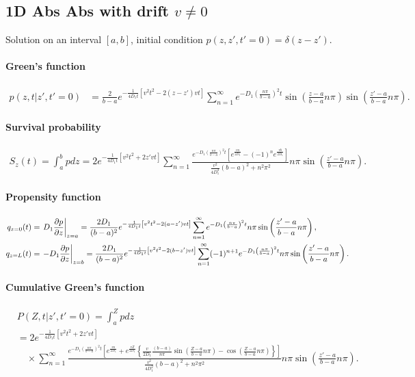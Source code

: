 
\subsection{1D Abs Abs with drift $v\neq 0$}

Solution on an interval $[a,b]$, initial condition $p(z,z',t'=0)=\delta (z-z')$.

\paragraph{Green's function}
\begin{align}
  p(z,t|z',t'=0) &= \frac{2}{b-a}e^{-\frac{1}{4D_1t}\left[v^2t^2 - 2(z-z')vt \right]}
  \sum_{n=1}^{\infty}
  e^{-D_1\left(\frac{n\pi}{b-a}\right)^2 t} \sin\left(\frac{z-a}{b-a}n\pi\right) \sin\left(\frac{z'-a}{b-a}n\pi\right).
\end{align}

\paragraph{Survival probability}
\begin{align}
  S_z(t) = \int_a^b pdz
  = 2e^{-\frac{1}{4D_1t}\left[ v^2t^2 + 2 z'vt \right]}
    \sum_{n=1}^{\infty}
	\frac{ e^{-D_1\left(\frac{n\pi}{b-a}\right)^2 t} \left[ e^{\frac{va}{2D_1}} - (-1)^n e^{\frac{vb}{2D_1}}\right] }
	     { \frac{v^2}{4D_1^2}(b-a)^2 + n^2\pi^2 }
	n\pi \sin\left(\frac{z'-a}{b-a}n\pi \right).
\end{align}

\paragraph{Propensity function}
\begin{align}
  q_{z=0}(t) &= \left.D_1 \frac{\partial p}{\partial z}\right|_{z=a} = \frac{2 D_1}{(b-a)^2} e^{-\frac{1}{4D_1 t}\left[ v^2t^2 - 2(a-z')vt \right]}
  \sum_{n=1}^{\infty} e^{-D_1\left(\frac{n\pi}{b-a}\right)^2 t} n\pi \sin\left(\frac{z'-a}{b-a}n\pi\right),\\
  q_{z=L}(t) &= \left.- D_1 \frac{\partial p}{\partial z}\right|_{z=b} = \frac{2 D_1}{(b-a)^2} e^{-\frac{1}{4D_1 t}\left[ v^2t^2 - 2(b-z')vt \right]}
  \sum_{n=1}^{\infty} (-1)^{n+1} e^{-D_1\left(\frac{n\pi}{b-a}\right)^2 t} n\pi \sin\left(\frac{z'-a}{b-a}n\pi\right).
\end{align}

\paragraph{Cumulative Green's function}
\begin{align}
 & P(Z,t|z',t'=0) = \int_a^Z p dz &\\
 & = 2e^{-\frac{1}{4D_1t}\left[v^2t^2 + 2z'vt \right]}  &\\
 & \quad\times \sum_{n=1}^{\infty}
      \frac{	e^{-D_1\left(\frac{n\pi}{b-a}\right)^2 t}
		\left[
		  e^{\frac{va}{2D_1}} + e^{\frac{vZ}{2D_1}}
		      \left\lbrace
			\frac{v}{2D_1}\frac{(b-a)}{n\pi}\sin\left(\frac{Z-a}{b-a}n\pi\right)
		      - \cos\left(\frac{Z-a}{b-a}n\pi\right)
		      \right\rbrace
		\right]
      }
      { \frac{v^2}{4D_1^2}(b-a)^2 + n^2\pi^2 } 
      n\pi \sin\left(\frac{z'-a}{b-a}n\pi\right).&
\end{align}